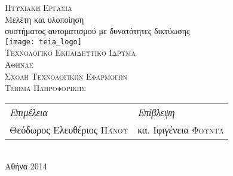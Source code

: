 
\begin{titlepage}

\begin{center}

\textsc{Πτυχιακή Εργασία}\\[-0.2cm]
{\LARGE\textsf{Μελέτη και υλοποίηση\\
συστήματος αυτοματισμού με δυνατότητες δικτύωσης}}\\[1cm]

\texttt{[image: teia\_logo]}\\[0.3cm]
\textsc{\LARGE Τεχνολογικό Εκπαιδευτικό Ίδρυμα\\Αθήνασ}\\[2em]

\textsc{\Large Σχολή Τεχνολογικών Εφαρμογών}\\%
\textsc{\LARGE Τμήμα Πληροφορικήσ}\\[2em]


\vfill

\begin{tabu} to \linewidth{X[l] X[r]}
\emph{Επιμέλεια} & \emph{Επίβλεψη}    \\
Θεόδωρος Ελευθέριος \textsc{Πάνου} & κα. Ιφιγένεια \textsc{Φουντά}
\end{tabu}\\[5cm]

\large{Αθήνα 2014}

\end{center}

\end{titlepage}
